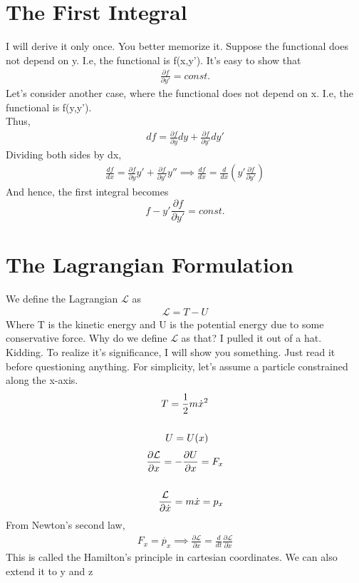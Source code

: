 \documentclass[12pt]{article}
\begin{document}
\section{The First Integral}
I will derive it only once. You better memorize it.
Suppose the functional does not depend on y. I.e, the functional is f(x,y'). It's easy to show that
\begin{align}
    \frac{\partial f}{\partial y'}=const.
\end{align}
Let's consider another case, where the functional does not depend on x. I.e, the functional is f(y,y').
\\ Thus,
\begin{align}
    df = \frac{\partial f}{\partial y}dy + \frac{\partial f}{\partial y'}dy'
\end{align}
Dividing both sides by dx,
\begin{align}
    \frac{df}{dx} = \frac{\partial f}{\partial y}y' + \frac{\partial f}{\partial y'}y''\implies\frac{df}{dx}=\frac{d}{dx}\left(y'\frac{\partial f}{\partial y'}\right)
\end{align}
And hence, the first integral becomes
\begin{equation}
    f-y'\frac{\partial f}{\partial y'}=const.
\end{equation}

\section{The Lagrangian Formulation}
We define the Lagrangian $\mathcal{L}$ as 
\begin{align}
    \mathcal{L}=T-U
\end{align}
Where T is the kinetic energy and U is the potential energy due to some conservative force.
Why do we define $\mathcal{L}$ as that? I pulled it out of a hat. \\
Kidding. To realize it's significance, I will show you something. Just read it before questioning anything.
For simplicity, let's assume a particle constrained along the x-axis.
\begin{align}
    T = \frac{1}{2}m\dot{x}^2 \notag \\\notag\\ U=U(x)\notag
\end{align}
\begin{align}
    \frac{\partial \mathcal{L}}{\partial x}=-\frac{\partial U}{\partial x}=F_x \\ \notag \\ \frac{\mathcal{L}}{\partial\dot{x}}=m\dot{x}=p_x
\end{align}
From Newton's second law,
\begin{align}
    F_x = \dot{p_x} \implies \frac{\partial \mathcal{L}}{\partial x}=\frac{d}{dt}\frac{\partial \mathcal{L}}{\partial \dot{x}}
\end{align}
This is called the Hamilton's principle in cartesian coordinates. We can also extend it to y and z
\end{document}
